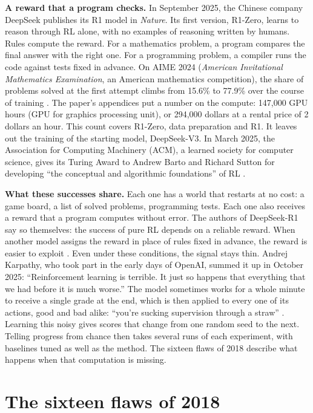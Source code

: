 \documentclass[11pt,a4paper]{article}
\begin{document}
\textbf{A reward that a program checks.} In September 2025, the Chinese
company DeepSeek publishes its R1 model in \emph{Nature}. Its first
version, R1-Zero, learns to reason through RL alone, with no examples of
reasoning written by humans. Rules compute the reward. For a mathematics
problem, a program compares the final answer with the right one. For a
programming problem, a compiler runs the code against tests fixed in
advance. On AIME 2024 (\emph{American Invitational Mathematics
Examination}, an American mathematics competition), the share of
problems solved at the first attempt climbs from 15.6\% to 77.9\% over
the course of training \autocite{deepseek2025r1}. The paper's appendices
put a number on the compute: 147,000 GPU hours (GPU for graphics
processing unit), or 294,000 dollars at a rental price of 2 dollars an
hour. This count covers R1-Zero, data preparation and R1. It leaves out
the training of the starting model, DeepSeek-V3. In March 2025, the
Association for Computing Machinery (ACM), a learned society for
computer science, gives its Turing Award to Andrew Barto and Richard
Sutton for developing ``the conceptual and algorithmic foundations'' of
RL \autocite{acm2025turing}.

\textbf{What these successes share.} Each one has a world that restarts
at no cost: a game board, a list of solved problems, programming tests.
Each one also receives a reward that a program computes without error.
The authors of DeepSeek-R1 say so themselves: the success of pure RL
depends on a reliable reward. When another model assigns the reward in
place of rules fixed in advance, the reward is easier to exploit
\autocite{deepseek2025r1}. Even under these conditions, the signal stays
thin. Andrej Karpathy, who took part in the early days of OpenAI, summed
it up in October 2025: ``Reinforcement learning is terrible. It just so
happens that everything that we had before it is much worse.'' The model
sometimes works for a whole minute to receive a single grade at the end,
which is then applied to every one of its actions, good and bad alike:
``you're sucking supervision through a straw''
\autocite{patel2025karpathy}. Learning this noisy gives scores that
change from one random seed to the next. Telling progress from chance
then takes several runs of each experiment, with baselines tuned as well
as the method. The sixteen flaws of 2018 describe what happens when that
computation is missing.

\section{The sixteen flaws of 2018}\label{the-sixteen-flaws-of-2018}
\end{document}
